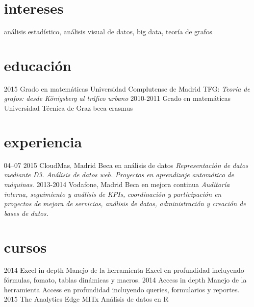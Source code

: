 \documentclass[]{friggeri-cv}
\begin{document}
\section{intereses}

análisis estadístico, análisis visual de datos, big data, teoría de grafos

\section{educación}

\begin{entrylist}
  \entry
    {2015}
    {Grado {\normalfont en matemáticas}}
    {Universidad Complutense de Madrid}
    {TFG: \emph{Teoría de grafos: desde Königsberg al tráfico urbano}}
  \entry
    {2010-2011}
    {Grado {\normalfont en matemáticas}}
    {Universidad Técnica de Graz}
    {beca erasmus}
\end{entrylist}

\section{experiencia}

\begin{entrylist}
  \entry
    {04–07 2015}
    {CloudMas, Madrid}
    {Beca en análisis de datos}
    {\emph{Representación de datos mediante D3. Análisis de datos web. Proyectos en aprendizaje automático de máquinas.}}
  \entry
    {2013-2014}
    {Vodafone, Madrid}
    {Beca en mejora continua}
    {\emph{Auditoría interna, seguimiento y análisis de KPIs, coordinación y participación en proyectos de mejora de servicios, análisis de datos, administración y creación de bases de datos.}}
\end{entrylist}

\section{cursos}

\begin{entrylist}
  \entry
    {2014}
    {Excel in depth}
    {}
    {{Manejo de la herramienta Excel en profundidad incluyendo fórmulas, fomato, tablas dinámicas y macros.}}
  \entry
    {2014}
    {Access in depth}
    {}
    {Manejo de la herramienta Access en profundidad incluyendo queries, formularios y reportes.}
  \entry
    {2015}
    {The Analytics Edge}
    {MITx}
    {Análisis de datos en R}
\end{entrylist}
\end{document}
